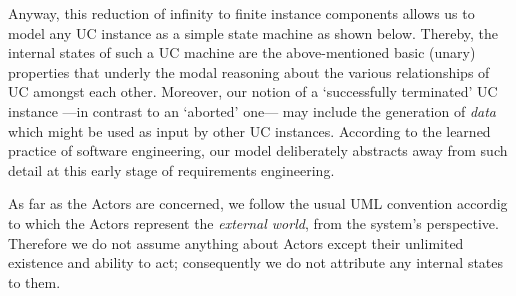 Anyway, this reduction of infinity to finite instance components allows us 
to model any UC instance as a simple state machine as shown below. Thereby, 
the internal states of such a UC machine are the above-mentioned basic (unary) 
properties that underly the modal reasoning about the various relationships of 
UC amongst each other. Moreover, our notion of a `successfully terminated' UC 
instance ---in contrast to an `aborted' one--- may include the generation of 
\emph{data} which might be used as input by other UC instances. According to
the learned practice of software engineering, our model deliberately abstracts 
away from such detail at this early stage of requirements engineering.

As far as the Actors are concerned, we follow the usual UML convention 
accordig to which the Actors represent the \emph{external world}, from 
the system's perspective. Therefore we do not assume anything about 
Actors except their unlimited existence and ability to act; consequently 
we do not attribute any internal states to them.

